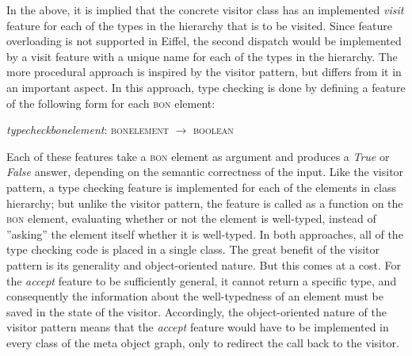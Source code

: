 In the above, it is implied that the concrete visitor class has an implemented \textit{visit} feature for each of the types in the hierarchy that is to be visited. Since feature overloading is not supported in Eiffel, the second dispatch would be implemented by a visit feature with a unique name for each of the types in the hierarchy.
The more procedural approach is inspired by the visitor pattern, but differs from it in an important aspect. In this approach, type checking is done by defining a feature of the following form for each \textsc{bon} element:
\begin{center}
\textit{type}\textunderscore\textit{check}\textunderscore\textit{bon}\textunderscore\textit{element}: \textsc{bon}\textunderscore\textsc{element} $\rightarrow$  \textsc{boolean}\\
\end{center}
Each of these features take a \textsc{bon} element as argument and produces a \textit{True} or \textit{False} answer, depending on the semantic correctness of the input. Like the visitor pattern, a type checking feature is implemented for each of the elements in class hierarchy; but unlike the visitor pattern, the feature is called as a function on the \textsc{bon} element, evaluating whether or not the element is well-typed, instead of ''asking'' the element itself whether it is well-typed.
In both approaches, all of the type checking code is placed in a single class. The great benefit of the visitor pattern is its generality and object-oriented nature. But this comes at a cost. For the \textit{accept} feature to be sufficiently general, it cannot return a specific type, and consequently the information about the well-typedness of an element must be saved in the state of the visitor. Accordingly, the object-oriented nature of the visitor pattern means that the \textit{accept} feature would have to be implemented in every class of the meta object graph, only to redirect the call back to the visitor.

